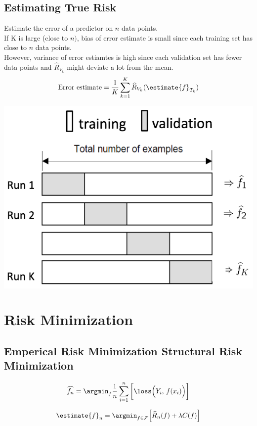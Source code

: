 \documentclass[18pt,a3paper,landscape, ncols=3]{cheatsheet}
\begin{document}
		\subsection{Estimating True Risk}
			\begin{mdframed}
				\begin{minipage}{0.5\linewidth}
					Estimate the error of a predictor on \(n\) data points.\\
					If K is large (close to \(n)\), bias of error estimate is small since each training set has close to \(n\) data points.\\
					However, variance of error estiamtes is high since each validation set has fewer data points and \(\widehat{R}_{V_{k}}\) might deviate a lot from the mean.\\
					\[
						\text{Error estimate} = \frac{1}{K} \sum_{k=1}^{K} \widehat{R}_{V_{k}} (\estimate{f}_{T_{k}})
					\]
				\end{minipage}%
				\begin{minipage}{0.5\linewidth}
					\hfill\includegraphics[width=0.85\linewidth]{estimating_true_risk.png}
				\end{minipage}
			\end{mdframed}

\section{Risk Minimization} \seperator
	\subsection{Emperical Risk Minimization \qquad\qquad\qquad Structural Risk Minimization}
		\begin{mdframed}
			\begin{minipage}{0.5\linewidth}
				\[
					\widehat{f_n} = \argmin_{f} \frac{1}{n} \sum_{i=1}^{n} \bigg[\loss \Big( Y_i,\, f(x_i) \Big) \bigg]
				\]
			\end{minipage}%
			\quad\vrule\quad%
			\begin{minipage}{0.5\linewidth}
				\[
					\estimate{f}_{n} = \argmin_{f \in \mathcal{F}} \Big\lbrack \widehat{R}_{n}(f) + \lambda C(f) \Big\rbrack
				\]
			\end{minipage}
		\end{mdframed}
\end{document}
